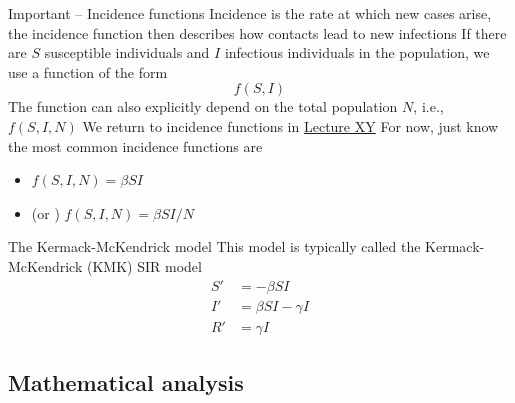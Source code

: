 \documentclass[aspectratio=43]{beamer}
\begin{document}
\begin{frame}{Important -- Incidence functions}
Incidence is the rate at which new cases arise, the incidence function then describes how contacts lead to new infections
\vfill
If there are $S$ susceptible individuals and $I$ infectious individuals in the population, we use a function of the form
\[
f(S,I)
\]
The function can also explicitly depend on the total population $N$, i.e., $f(S,I,N)$
\vfill
We return to incidence functions in \href{no.se}{Lecture XY}
\vfill
For now, just know the most common incidence functions are
\begin{itemize}
\item {} $f(S,I,N)=\beta SI$
\item {} (or )  $f(S,I,N)=\beta SI/N$
\end{itemize}
\end{frame}


\begin{frame}{The Kermack-McKendrick model}
This model is typically called the Kermack-McKendrick (KMK) SIR model 
\begin{subequations}\label{sys:KMK}
  \begin{align}
    S' &= -\beta SI \tag{1a}\label{sys:KMK_dS} \\
    I' &= \beta SI-\gamma I  \tag{1b}\label{sys:KMK_dI} \\
    R' &= \gamma I  \tag{1c}\label{sys:KMK_dR}
    \end{align}  
\end{subequations}
\vfill
\begin{center}
\end{center}
\end{frame}

\subsection{Mathematical analysis}
\end{document}
